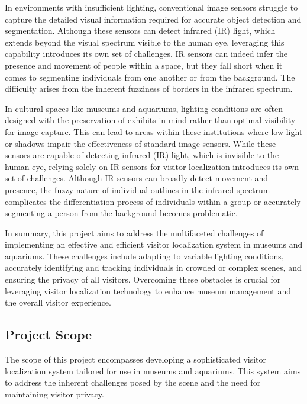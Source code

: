 In environments with insufficient lighting, conventional image sensors struggle to capture the detailed visual information required for accurate object detection and segmentation. Although these sensors can detect infrared (IR) light, which extends beyond the visual spectrum visible to the human eye, leveraging this capability introduces its own set of challenges. IR sensors can indeed infer the presence and movement of people within a space, but they fall short when it comes to segmenting individuals from one another or from the background. The difficulty arises from the inherent fuzziness of borders in the infrared spectrum.

In cultural spaces like museums and aquariums, lighting conditions are often designed with the preservation of exhibits in mind rather than optimal visibility for image capture. This can lead to areas within these institutions where low light or shadows impair the effectiveness of standard image sensors. While these sensors are capable of detecting infrared (IR) light, which is invisible to the human eye, relying solely on IR sensors for visitor localization introduces its own set of challenges. Although IR sensors can broadly detect movement and presence, the fuzzy nature of individual outlines in the infrared spectrum complicates the differentiation process of individuals within a group or accurately segmenting a person from the background becomes problematic.

In summary, this project aims to address the multifaceted challenges of implementing an effective and efficient visitor localization system in museums and aquariums. These challenges include adapting to variable lighting conditions, accurately identifying and tracking individuals in crowded or complex scenes, and ensuring the privacy of all visitors. Overcoming these obstacles is crucial for leveraging visitor localization technology to enhance museum management and the overall visitor experience.

\subsection{Project Scope}

The scope of this project encompasses developing a sophisticated visitor localization system tailored for use in museums and aquariums. This system aims to address the inherent challenges posed by the scene and the need for maintaining visitor privacy.

